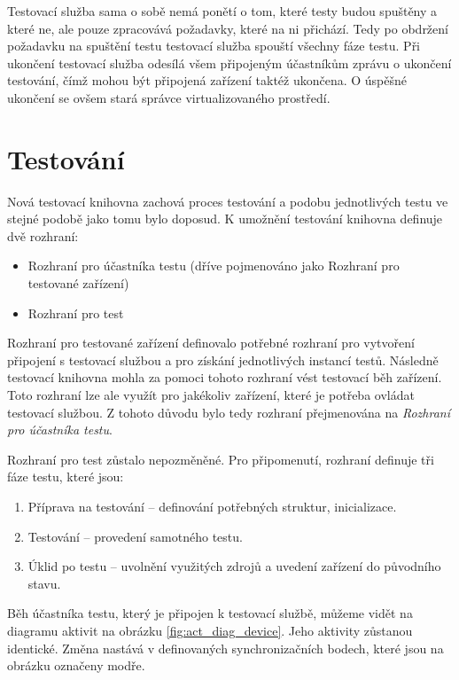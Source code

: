 Testovací služba sama o sobě nemá ponětí o tom, které testy budou spuštěny a které ne, ale pouze zpracovává požadavky, které na ni přichází. Tedy po obdržení požadavku na spuštění testu testovací služba spouští všechny fáze testu. Při ukončení testovací služba odesílá všem připojeným účastníkům zprávu o ukončení testování, čímž mohou být připojená zařízení taktéž ukončena. O úspěšné ukončení se ovšem stará správce virtualizovaného prostředí.


\section{Testování}

Nová testovací knihovna zachová proces testování a podobu jednotlivých testu ve stejné podobě jako tomu bylo doposud. K umožnění testování knihovna definuje dvě rozhraní:

\begin{itemize}
    \item Rozhraní pro účastníka testu (dříve pojmenováno jako Rozhraní pro testované zařízení)
    \item Rozhraní pro test 
\end{itemize}

Rozhraní pro testované zařízení definovalo potřebné rozhraní pro vytvoření připojení s testovací službou a pro získání jednotlivých instancí testů. Následně testovací knihovna mohla za pomoci tohoto rozhraní vést testovací běh zařízení. Toto rozhraní lze ale využít pro jakékoliv zařízení, které je potřeba ovládat testovací službou. Z tohoto důvodu bylo tedy rozhraní přejmenována na \textit{Rozhraní pro účastníka testu}. 

Rozhraní pro test zůstalo nepozměněné. Pro připomenutí, rozhraní definuje tři fáze testu, které jsou:

\begin{enumerate}
    \item Příprava na testování -- definování potřebných struktur, inicializace.
    \item Testování -- provedení samotného testu.
    \item Úklid po testu -- uvolnění využitých zdrojů a uvedení zařízení do původního stavu.
\end{enumerate}

Běh účastníka testu, který je připojen k testovací službě, můžeme vidět na diagramu aktivit na obrázku \ref{fig:act_diag_device}. Jeho aktivity zůstanou identické. Změna nastává v definovaných synchronizačních bodech, které jsou na obrázku označeny modře. 

